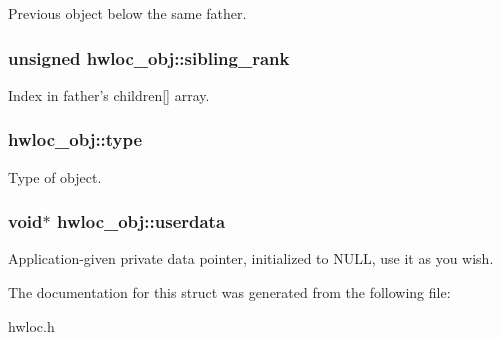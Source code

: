 Previous object below the same father. \hypertarget{structhwloc__obj_aaa6043eee6f55869933c1d974efd9acd}{
\subsubsection[{sibling\_\-rank}]{\setlength{\rightskip}{0pt plus 5cm}unsigned {\bf hwloc\_\-obj::sibling\_\-rank}}}
\label{structhwloc__obj_aaa6043eee6f55869933c1d974efd9acd}


Index in father's {\ttfamily children}\mbox{[}\mbox{]} array. \hypertarget{structhwloc__obj_acc4f0803f244867e68fe0036800be5de}{
\subsubsection[{type}]{ {\bf hwloc\_\-obj::type}}}
\label{structhwloc__obj_acc4f0803f244867e68fe0036800be5de}


Type of object. \hypertarget{structhwloc__obj_a76fd3ac94401cf32dfccc3a3a8de68a5}{
\subsubsection[{userdata}]{\setlength{\rightskip}{0pt plus 5cm}void$\ast$ {\bf hwloc\_\-obj::userdata}}}
\label{structhwloc__obj_a76fd3ac94401cf32dfccc3a3a8de68a5}


Application-\/given private data pointer, initialized to {\ttfamily NULL}, use it as you wish. 

The documentation for this struct was generated from the following file:\begin{DoxyCompactItemize}
\item 
hwloc.h\end{DoxyCompactItemize}
